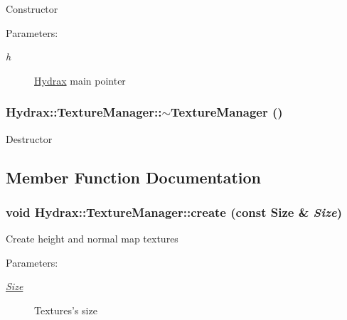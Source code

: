 \begin{CompactItemize}
Constructor \begin{Desc}
\item[Parameters:]
\begin{description}
\item[{\em h}]\hyperlink{class_hydrax_1_1_hydrax}{Hydrax} main pointer \end{description}
\end{Desc}
\hypertarget{class_hydrax_1_1_texture_manager_d7e356de2834c2f1668826f21c1dbf1d}{
\subsubsection[{$\sim$TextureManager}]{\setlength{\rightskip}{0pt plus 5cm}Hydrax::TextureManager::$\sim$TextureManager ()}}
\label{class_hydrax_1_1_texture_manager_d7e356de2834c2f1668826f21c1dbf1d}


Destructor 

\subsection{Member Function Documentation}
\hypertarget{class_hydrax_1_1_texture_manager_30bfb59332540e897c43193474b4aa19}{
\subsubsection[{create}]{\setlength{\rightskip}{0pt plus 5cm}void Hydrax::TextureManager::create (const {\bf Size} \& {\em Size})}}
\label{class_hydrax_1_1_texture_manager_30bfb59332540e897c43193474b4aa19}


Create height and normal map textures \begin{Desc}
\item[Parameters:]
\begin{description}
\item[{\em \hyperlink{struct_hydrax_1_1_size}{Size}}]Textures's size \end{description}
\end{Desc}
\hypertarget{class_hydrax_1_1_texture_manager_7f15f24a8ff1372f6a1840c27aec655f}{
}
\end{CompactItemize}
